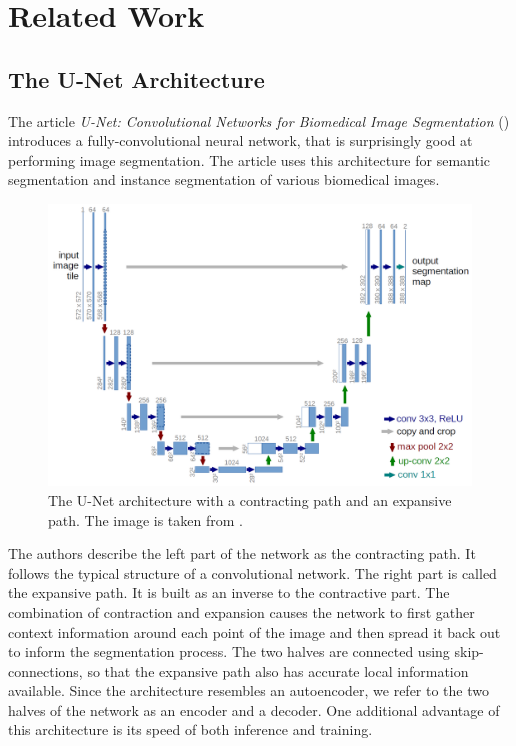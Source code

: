 \chapter{Related Work}
\label{chap:RelatedWork}

\section{The U-Net Architecture}

The article \emph{U-Net: Convolutional Networks for Biomedical Image Segmentation} (\cite{UNet}) introduces a fully-convolutional neural network, that is surprisingly good at performing image segmentation. The article uses this architecture for semantic segmentation and instance segmentation of various biomedical images.

\begin{figure}[ht]
    \centering
    \includegraphics[width=145mm]{../img/u-net-architecture.png}
    \caption{The U-Net architecture with a contracting path and an expansive path. The image is taken from \cite{UNet}.}
    \label{fig:UNetArchitecture}
\end{figure}

The authors describe the left part of the network as the contracting path. It follows the typical structure of a convolutional network. The right part is called the expansive path. It is built as an inverse to the contractive part. The combination of contraction and expansion causes the network to first gather context information around each point of the image and then spread it back out to inform the segmentation process. The two halves are connected using skip-connections, so that the expansive path also has accurate local information available. Since the architecture resembles an autoencoder, we refer to the two halves of the network as an encoder and a decoder. One additional advantage of this architecture is its speed of both inference and training.


